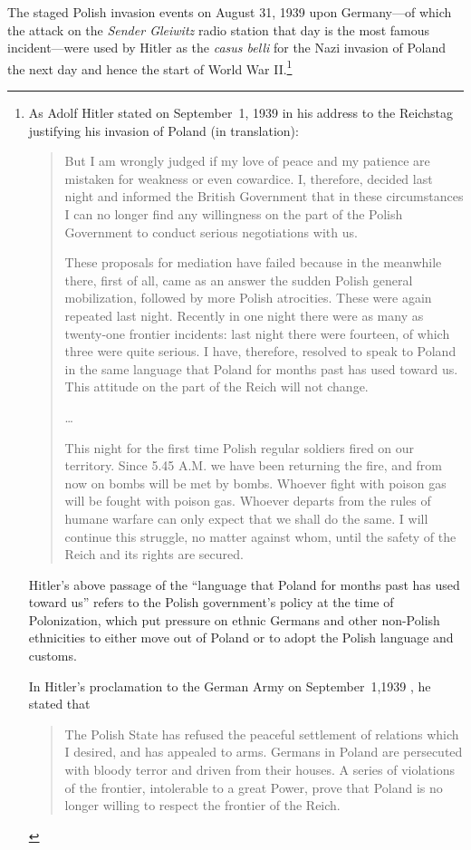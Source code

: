 \documentclass[letterpaper,12pt]{article}
\begin{document}
The staged Polish invasion events on August 31, 1939 upon Germany---of which the attack on the \emph{Sender Gleiwitz} radio station that day is the most famous incident---were used by Hitler as the \emph{casus belli} for the Nazi invasion of Poland the next day and hence the start of World War II.\footnote{As Adolf Hitler stated on September~1, 1939 in his address to the Reichstag \cite{YaleLawSchool1939-09-01b} justifying his invasion of Poland (in translation): \begin{quotation}
But I am wrongly judged if my love of peace and my patience are mistaken for weakness or even cowardice. I, therefore, decided last night and informed the British Government that in these circumstances I can no longer find any willingness on the part of the Polish Government to conduct serious negotiations with us.

These proposals for mediation have failed because in the meanwhile there, first of all, came as an answer the sudden Polish general mobilization, followed by more Polish atrocities. These were again repeated last night. Recently in one night there were as many as twenty-one frontier incidents: last night there were fourteen, of which three were quite serious. I have, therefore, resolved to speak to Poland in the same language that Poland for months past has used toward us. This attitude on the part of the Reich will not change.

\ldots

This night for the first time Polish regular soldiers fired on our territory. Since 5.45 A.M. we have been returning the fire, and from now on bombs will be met by bombs. Whoever fight with poison gas will be fought with poison gas. Whoever departs from the rules of humane warfare can only expect that we shall do the same. I will continue this struggle, no matter against whom, until the safety of the Reich and its rights are secured.
\end{quotation} Hitler's above passage of the ``language that Poland for months past has used toward us'' refers to the Polish government's policy at the time of Polonization, which put pressure on ethnic Germans and other non-Polish ethnicities to either move out of Poland or to adopt the Polish language and customs.\par
    In Hitler's proclamation to the German Army on September~1,1939 \cite{YaleLawSchool1939-09-01a}, he stated that \begin{quotation}
The Polish State has refused the peaceful settlement of relations which I desired, and has appealed to arms. Germans in Poland are persecuted with bloody terror and driven from their houses. A series of violations of the frontier, intolerable to a great Power, prove that Poland is no longer willing to respect the frontier of the Reich.


\end{quotation}}
\end{document}
